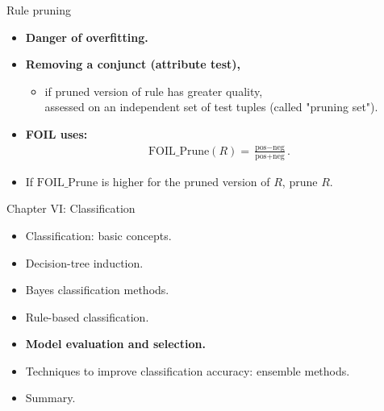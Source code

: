 \documentclass[aspectratio=169,t,table]{beamer}
\begin{document}
  {
    \begin{frame}{Rule pruning}
      \begin{itemize}
        \item \textbf{Danger of {\color{airforceblue}overfitting}.}
        \item \textbf{Removing a conjunct (attribute test),}
        \begin{itemize}
          \item if pruned version of rule has greater quality,\\
                assessed on an independent set of test tuples (called "pruning set").
        \end{itemize}
        \item \textbf{FOIL uses:}
              \begin{align}
                \text{FOIL\_Prune}(R) = \frac{\text{pos}-\text{neg}}{\text{pos}+\text{neg}}.
              \end{align}
        \item If $\text{FOIL\_Prune}$ is higher for the pruned version of $R$, prune $R$.
      \end{itemize}
    \end{frame}
  }

  {
    \begin{frame}{Chapter VI: Classification}
        \begin{itemize}
            \item Classification: basic concepts.
            \item Decision-tree induction.
            \item Bayes classification methods.
            \item Rule-based classification.
            \item \textbf{Model evaluation and selection.}
            \item Techniques to improve classification accuracy: ensemble methods.
            \item Summary.
        \end{itemize}
    \end{frame}
  }
\end{document}
